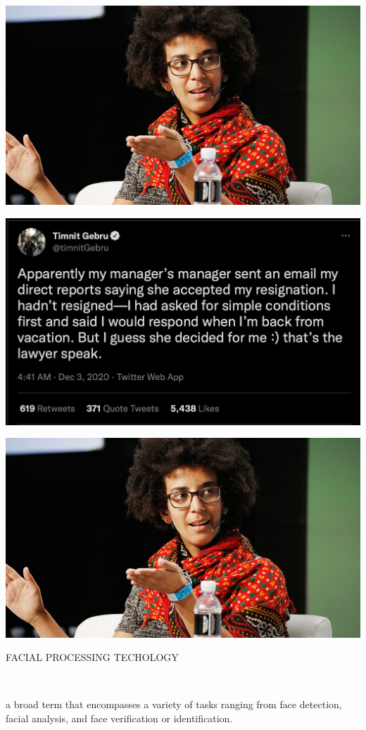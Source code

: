 \documentclass{beamer}
\begin{document}
\begin{frame}
    \centering
    \includegraphics[width=.75\textwidth]{static/timnit_gebru}
\end{frame}

\begin{frame}
    \centering
    \includegraphics[width=.75\textwidth]{static/timnit_gebru_tweet}
\end{frame}

\begin{frame}
    \centering
    \includegraphics[width=.75\textwidth]{static/timnit_gebru}
\end{frame}

\begin{frame}
    \begin{center}
    \LARGE{FACIAL PROCESSING TECHOLOGY}

    \vspace{.5cm}

    \hspace{-8cm}\\
    \end{center}
    \normalsize{a broad term that encompasses a variety of tasks ranging from face detection, facial analysis, and face verification or identification.}

\end{frame}
\end{document}
